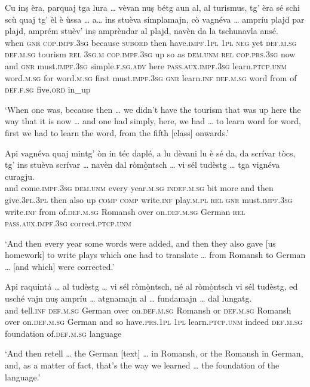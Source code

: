 \begin{linenumbers}
	\gll    Cu inṣ èra, parquaj tga lura … vèvan nuṣ bétg aun al, al turismus, tg’ èra sé schi scù quaj tg’ èl è ùssa … a… ins stuèva simplamajn, cò vagnéva …  ampríu plajd par plajd, amprém stuèv’ inṣ amprèndar al plajd, navèn da la tschunavla ansé.\\
	when \textsc{gnr} \textsc{cop.impf.3sg} because \textsc{subord} then {} have.\textsc{impf.1pl} \textsc{1pl} \textsc{neg} yet \textsc{def.m.sg} \textsc{def.m.sg} tourism \textsc{rel} \textsc{3sg.m} \textsc{cop.impf.3sg} up so as \textsc{dem.unm} \textsc{rel} \textsc{cop.prs.3sg} now {} and \textsc{gnr} must.\textsc{impf.3sg} simple.\textsc{f.sg.adv} here \textsc{pass.aux.impf.3sg} {} learn.\textsc{ptcp.unm} word.\textsc{m.sg} for word.\textsc{m.sg} first must.\textsc{impf.3sg} \textsc{gnr} learn.\textsc{inf} \textsc{def.m.sg} word from of \textsc{def.f.sg} five.\textsc{ord} in\_up\\
\end{linenumbers}
\medskip
\glt `When one was, because then … we didn’t have the tourism that was up here the way that it is now … and one had simply, here, we had … to learn word for word, first we had to learn the word, from the fifth [class] onwards.'
\medskip

\begin{linenumbers}
	\gll    Api vagnéva quaj mintg’ òn in téc daplé, a lu dèvani lu è sé da, da scrívar tòcs, tg’ ins stuèva scrívar … navèn dal ròmò̱ntsch … vi sél tudèstg … tga vignéva curagju.\\
	and come.\textsc{impf.3sg} \textsc{dem.unm} every year.\textsc{m.sg} \textsc{indef.m.sg} bit more and then give.\textsc{3pl.3pl} then also up \textsc{comp} \textsc{comp} write.\textsc{inf} play.\textsc{m.pl} \textsc{rel} \textsc{gnr} must.\textsc{impf.3sg} write.\textsc{inf} {} from  of.\textsc{def.m.sg} Romansh {} over on.\textsc{def.m.sg} German {} \textsc{rel} \textsc{pass.aux.impf.3sg} correct.\textsc{ptcp.unm}\\
\end{linenumbers}
\medskip
\glt `And then every year some words were added, and then they also gave [us homework] to write plays which one had to translate … from Romansh to German … [and which] were corrected.'
\medskip

\begin{linenumbers}
	\gll    Api raquintá … al tudèstg … vi sél ròmò̱ntsch, né al ròmò̱ntsch vi sél tudèstg, ed usché vajn nuṣ ampríu … atgnamajn al … fundamajn … dal  lungatg.\\
	and tell.\textsc{inf} {} \textsc{def.m.sg} German {} over on.\textsc{def.m.sg} Romansh or  \textsc{def.m.sg} Romansh over  on.\textsc{def.m.sg} German and so have.\textsc{prs.1pl} \textsc{1pl} learn.\textsc{ptcp.unm} {} indeed \textsc{def.m.sg} {} foundation {} of.\textsc{def.m.sg} language\\
\end{linenumbers}
\medskip
\glt `And then retell … the German [text] … in Romansh, or the Romansh in German, and, as a matter of fact, that’s the way we learned … the foundation of the language.'
\medskip


